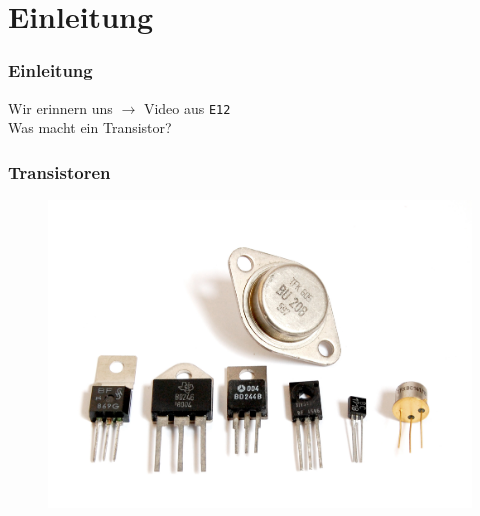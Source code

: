 

\subtitle{Technik Klasse E 13: \\
  Transistor \& Verstärker \\[2em]}
\date{Stand 18.09.2017}



\section*{Einleitung}
\begin{frame}
  \frametitle{Einleitung}
  Wir erinnern uns $\rightarrow$ Video aus \texttt{E12}\\[1.5em]
  Was macht ein Transistor?
\end{frame}

\begin{frame}
  \frametitle{Transistoren}
  \begin{figure}
    \includegraphics[width=\textwidth,height=.65\textheight,keepaspectratio]{e13/Transistors-white.jpg}
  \end{figure}
\end{frame}

